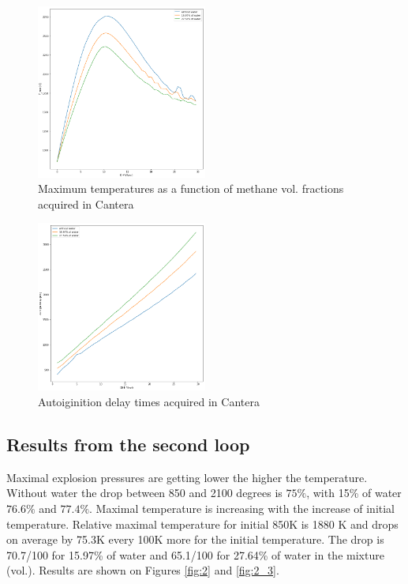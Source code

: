 \documentclass[a4paper]{article}
\begin{document}
\begin{figure}[h!]
\centering
\includegraphics[width=0.5\textwidth]{1_Tmax_to_CH4.png}
\caption{\label{fig:1_2}Maximum temperatures as a function of methane vol. fractions acquired in Cantera}
\end{figure}
\begin{figure}[H]
\centering
\includegraphics[width=0.5\textwidth]{1_adt_to_CH4.png}
\caption{\label{fig:1_3}Autoiginition delay times acquired in Cantera}
\end{figure}

\subsection{Results from the second loop}
Maximal explosion pressures are getting lower the higher the temperature. Without water the drop between 850 and 2100 degrees is $75\%$, with 15\% of water $76.6\%$ and $77.4\%$.
Maximal temperature is increasing with the increase of initial temperature. Relative maximal temperature for initial 850K is 1880 K and drops on average by 75.3K every 100K more for the initial temperature. The drop is 70.7/100 for 15.97\% of water and 65.1/100 for 27.64\% of water in the mixture (vol.).
Results are shown on Figures \ref{fig:2} and \ref{fig:2_3}.
\end{document}
